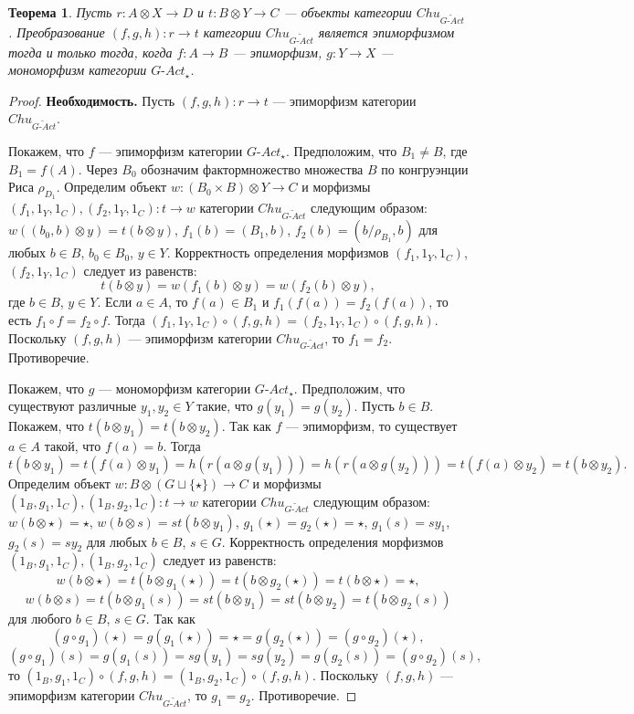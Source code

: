 \documentclass[a4paper,12pt]{article}
\newtheorem{theorem}{Теорема}
\newcommand{\GAct}{G\text{-}Act}
\begin{document}
\begin{theorem}\label{epimorphism-gact}
    Пусть $r: A \otimes X \to D$ и $t: B \otimes Y \to C$ --- объекты категории $Chu_{\widetilde{\GAct}}$. Преобразование $(f,g,h): r \to t$ категории $Chu_{\widetilde{\GAct}}$ является эпиморфизмом тогда и только тогда, когда $f: A \to B$ --- эпиморфизм, $g: Y \to X$ --- мономорфизм категории $\GAct_{\star}$.
\end{theorem}
\begin{proof}
    \textbf{Необходимость.} Пусть $(f,g,h): r \to t$ --- эпиморфизм категории $Chu_{\widetilde{\GAct}}$.

    Покажем, что $f$ --- эпиморфизм категории $\GAct_{\star}$. Предположим, что $B_1 \ne B$, где $B_1 = f(A)$. Через $B_0$ обозначим фактормножество множества $B$ по конгруэнции Риса $\rho_{D_1}$. Определим объект $w: (B_0 \times B) \otimes Y \to C$ и морфизмы $(f_1,1_Y,1_C), (f_2,1_Y,1_C): t \to w$ категории $Chu_{\widetilde{\GAct}}$ следующим образом: $w((b_0,b) \otimes y) = t(b \otimes y)$, $f_1(b) = (B_1,b)$, $f_2(b) = (b/\rho_{B_1},b)$ для любых $b \in B$, $b_0 \in B_0$, $y \in Y$. Корректность определения морфизмов $(f_1,1_Y,1_C)$, $(f_2,1_Y,1_C)$ следует из равенств:
    $$
        t(b \otimes y) = w(f_1(b) \otimes y) = w(f_2(b) \otimes y),
    $$
    где $b \in B$, $y \in Y$. Если $a \in A$, то $f(a) \in B_1$ и $f_1(f(a)) = f_2(f(a))$, то есть $f_1 \circ f = f_2 \circ f$. Тогда $(f_1,1_Y,1_C) \circ (f,g,h) = (f_2,1_Y,1_C) \circ (f,g,h)$. Поскольку $(f,g,h)$ --- эпиморфизм категории $Chu_{\widetilde{\GAct}}$, то $f_1 = f_2$. Противоречие.

    Покажем, что $g$ --- мономорфизм категории $\GAct_{\star}$. Предположим, что существуют различные $y_1, y_2 \in Y$ такие, что $g(y_1) = g(y_2)$. Пусть $b \in B$. Покажем, что $t(b \otimes y_1) = t(b \otimes y_2)$. Так как $f$ --- эпиморфизм, то существует $a \in A$ такой, что $f(a) = b$. Тогда
    $$
        t(b \otimes y_1) = t(f(a) \otimes y_1) = h(r(a \otimes g(y_1))) = h(r(a \otimes g(y_2))) = t(f(a) \otimes y_2) = t(b \otimes y_2).
    $$
    Определим объект $w: B \otimes (G \sqcup \{\star\}) \to C$ и морфизмы $(1_B,g_1,1_C), (1_B,g_2,1_C): t \to w$ категории $Chu_{\widetilde{\GAct}}$ следующим образом: $w(b \otimes \star) = \star$, $w(b \otimes s) = st(b \otimes y_1)$, $g_1(\star) = g_2(\star) = \star$, $g_1(s) = sy_1$, $g_2(s) = sy_2$ для любых $b \in B$, $s \in G$. Корректность определения морфизмов $(1_B,g_1,1_C), (1_B,g_2,1_C)$ следует из равенств:
    $$
        w(b \otimes \star) = t(b \otimes g_1(\star)) = t(b \otimes g_2(\star)) = t(b \otimes \star) = \star,
    $$
    $$
        w(b \otimes s) = t(b \otimes g_1(s)) = st(b \otimes y_1) = st(b \otimes y_2) = t(b \otimes g_2(s))
    $$
    для любого $b \in B$, $s \in G$. Так как
    $$
        (g \circ g_1)(\star) = g(g_1(\star)) = \star = g(g_2(\star)) = (g \circ g_2)(\star),
    $$
    $$
        (g \circ g_1)(s) = g(g_1(s)) = sg(y_1) = sg(y_2) = g(g_2(s)) = (g \circ g_2)(s),
    $$
    то $(1_B,g_1,1_C) \circ (f,g,h) = (1_B,g_2,1_C) \circ (f,g,h)$. Поскольку $(f,g,h)$ --- эпиморфизм категории $Chu_{\widetilde{\GAct}}$, то $g_1 = g_2$. Противоречие.


\end{proof}
\end{document}
